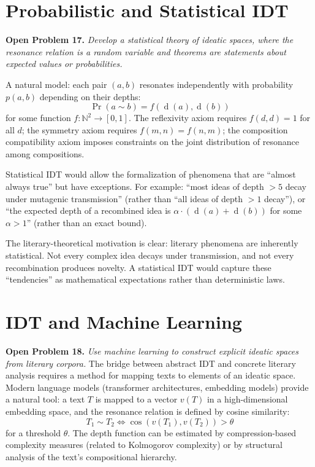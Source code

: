 \documentclass[11pt,openany]{book}
\theoremstyle{definition}
\theoremstyle{plain}
\theoremstyle{remark}
\newcommand{\res}{\sim}                      %
\newcommand{\depth}{\operatorname{d}}       %
\begin{document}
\section{Probabilistic and Statistical IDT}

\textbf{Open Problem 17.} \emph{Develop a statistical theory of ideatic spaces, where the resonance relation is a random variable and theorems are statements about expected values or probabilities.}

A natural model: each pair $(a, b)$ resonates independently with probability $p(a, b)$ depending on their depths:
\[
\Pr(a \res b) = f(\depth(a), \depth(b))
\]
for some function $f : \mathbb{N}^2 \to [0, 1]$. The reflexivity axiom requires $f(d, d) = 1$ for all $d$; the symmetry axiom requires $f(m, n) = f(n, m)$; the composition compatibility axiom imposes constraints on the joint distribution of resonance among compositions.

Statistical IDT would allow the formalization of phenomena that are ``almost always true'' but have exceptions. For example: ``most ideas of depth $> 5$ decay under mutagenic transmission'' (rather than ``all ideas of depth $> 1$ decay''), or ``the expected depth of a recombined idea is $\alpha \cdot (\depth(a) + \depth(b))$ for some $\alpha > 1$'' (rather than an exact bound).

The literary-theoretical motivation is clear: literary phenomena are inherently statistical. Not every complex idea decays under transmission, and not every recombination produces novelty. A statistical IDT would capture these ``tendencies'' as mathematical expectations rather than deterministic laws.

\section{IDT and Machine Learning}

\textbf{Open Problem 18.} \emph{Use machine learning to construct explicit ideatic spaces from literary corpora.} The bridge between abstract IDT and concrete literary analysis requires a method for mapping texts to elements of an ideatic space. Modern language models (transformer architectures, embedding models) provide a natural tool: a text $T$ is mapped to a vector $v(T)$ in a high-dimensional embedding space, and the resonance relation is defined by cosine similarity:
\[
T_1 \res T_2 \iff \cos(v(T_1), v(T_2)) > \theta
\]
for a threshold $\theta$. The depth function can be estimated by compression-based complexity measures (related to Kolmogorov complexity) or by structural analysis of the text's compositional hierarchy.
\end{document}
